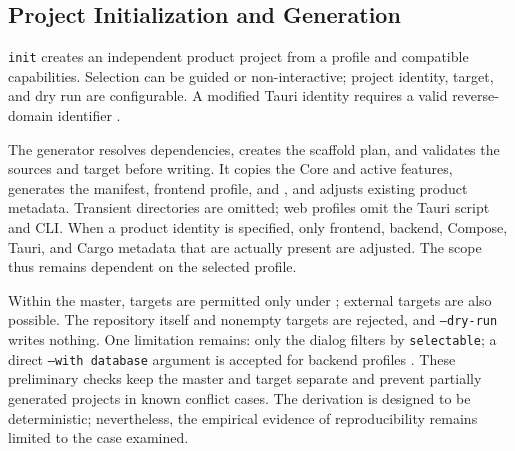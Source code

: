 \subsection{Project Initialization and Generation}
\label{subsec:projektinitialisierung-generierung}

\texttt{init} creates an independent product project from a profile and
compatible capabilities. Selection can be guided or non-interactive; project
identity, target, and dry run are configurable. A modified Tauri identity
requires a valid reverse-domain identifier
\parencite{kleiveist2026profiles,kleiveist2026tooling}.



The generator resolves dependencies, creates the scaffold plan, and validates
the sources and target before writing. It copies the Core and active features,
generates the manifest, frontend profile, and , and adjusts
existing product metadata. Transient directories are omitted; web profiles
omit the Tauri script and CLI.
When a product identity is specified, only frontend, backend, Compose, Tauri,
and Cargo metadata that are actually present are adjusted. The scope thus
remains dependent on the selected profile.

Within the master, targets are permitted only under ;
external targets are also possible. The repository itself and nonempty targets
are rejected, and \texttt{--dry-run} writes nothing. One limitation remains:
only the dialog filters by \texttt{selectable}; a direct
\texttt{--with database} argument is accepted for backend profiles
\parencite{kleiveist2026governance-snapshot}.
These preliminary checks keep the master and target separate and prevent
partially generated projects in known conflict cases. The derivation is
designed to be deterministic; nevertheless, the empirical evidence of
reproducibility remains limited to the case examined.
